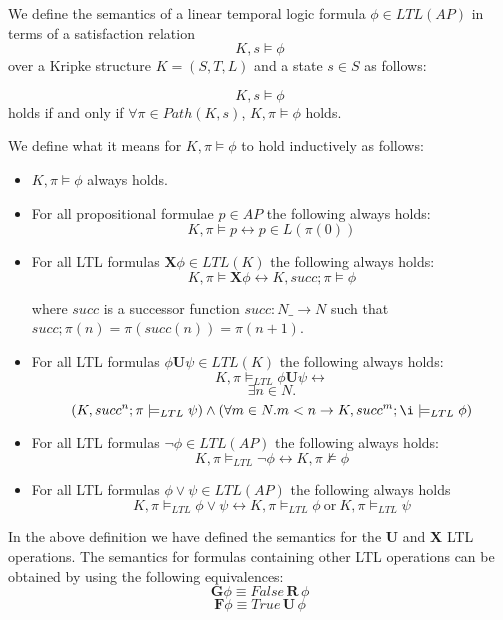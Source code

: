 \begin{mydef}
We define the semantics of a linear temporal logic formula $\phi \in LTL(AP)$ in terms of a satisfaction relation $$K,s \models \phi$$ over a Kripke structure $K = (S,T,L)$ and a state $s \in S$ as follows:

$$K,s \models \phi$$ holds if and only if $\forall \pi \in Path(K, s)$, $K,\pi \models \phi$ holds.

We define what it means for $K, \pi \models \phi$ to hold inductively as follows:

\begin{itemize} 
\item $K,\pi \models \phi$ always holds.

\item For all propositional formulae $p \in AP$ the following always holds:
     $$K,\pi \models p \leftrightarrow p \in L(\pi(0))$$

\item For all LTL formulas $\mathbf{X} \phi \in LTL(K)$ the following always holds:
$$ K, \pi \models \mathbf{X} \phi \leftrightarrow K, succ;\pi \models \phi $$

where $succ$ is a successor function $succ: N \_ \to N$ such that $succ;\pi(n) = \pi(succ(n)) = \pi(n + 1)$.

\item For all LTL formulas $\phi \mathbf{U} \psi \in LTL(K)$ the following always holds:
$$K, \pi \models_{LTL} \phi \mathbf{U} \psi \leftrightarrow$$
$$\exists n \in N.$$
$$(K,succ^n; \pi \models_{LTL} \psi) \wedge (\forall m \in N. m < n \to K, succ^m;\i \models_{LTL} \phi)$$

\item For all LTL formulas $\neg \phi \in LTL(AP)$ the following always holds:
$$K,\pi \models_{LTL} \neg \phi \leftrightarrow K,\pi \not\models \phi $$

\item For all LTL formulas $\phi \vee \psi \in LTL(AP)$ the following always holds
$$K,\pi \models_{LTL} \phi \vee \psi \leftrightarrow K,\pi \models_{LTL} \phi \ \mathrm{or} \ K,\pi \models_{LTL} \psi $$

\end{itemize}

\end{mydef}
In the above definition we have defined the semantics for the \textbf{U} and \textbf{X} LTL operations. 
The semantics for formulas containing other LTL operations can be obtained by using the following equivalences:
$$\textbf{G} \phi \equiv False \, \mathbf{R} \, \phi $$
$$\textbf{F} \phi \equiv   True \, \mathbf{U} \, \phi$$

